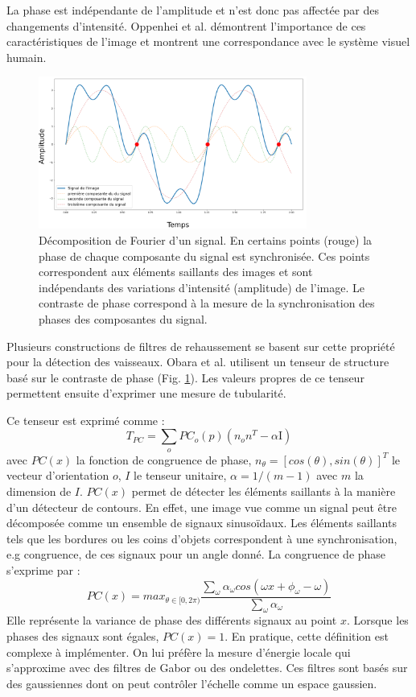 La phase est indépendante de l'amplitude et n'est donc pas affectée par des changements d'intensité. Oppenhei et al. \cite{Oppenheim1981_phase_importance} démontrent l'importance de ces caractéristiques de l'image et montrent une correspondance avec le système visuel humain. 
\begin{figure}[h]
  \centering
  \includegraphics[height=5cm]{Images/PC_decomposition.png}
  \caption{Décomposition de Fourier d'un signal. En certains points (rouge) la phase de chaque composante du signal est synchronisée. Ces points correspondent aux éléments saillants des images et sont indépendants des variations d'intensité (amplitude) de l'image. Le contraste de phase correspond à la mesure de la synchronisation des phases des composantes du signal.}
  \label{fig:phase_congruency}
\end{figure}
Plusieurs constructions de filtres de rehaussement se basent sur cette propriété pour la détection des vaisseaux. Obara et al. \cite{Obara2012_phase} utilisent un tenseur de structure basé sur le contraste de phase (Fig. \ref{fig:phase_congruency}). Les valeurs propres de ce tenseur permettent ensuite d'exprimer une mesure de tubularité.

Ce tenseur est exprimé comme :
\begin{equation}
  T_{PC} = \sum_o PC_{o}(p)(n_{o}n^T - \alpha \text{I})
\end{equation}
avec $PC(x)$ la fonction de congruence de phase, $n_{\theta}=[cos(\theta),sin(\theta)]^T$ le vecteur d'orientation $o$, $I$ le tenseur unitaire, $\alpha = 1/(m-1)$ avec $m$ la dimension de $I$. $PC(x)$ permet de détecter les éléments saillants à la manière d'un détecteur de contours.
En effet, une image vue comme un signal peut être décomposée comme un ensemble de signaux sinusoïdaux. Les éléments saillants tels que les bordures ou les coins d'objets correspondent à une synchronisation, e.g congruence, de ces signaux pour un angle donné. La congruence de phase s'exprime par :
\begin{equation}
  PC(x) = max_{\theta \in [0,2\pi)}  \frac{\sum_\omega \alpha_{\omega}cos(\omega x + \phi_{\omega} - \omega)  }{\sum_\omega \alpha_{\omega} }
\end{equation}
Elle représente la variance de phase des différents signaux au point $x$. Lorsque les phases des signaux sont égales, $PC(x)=1$.
En pratique, cette définition est complexe à implémenter. On lui préfère la mesure d'énergie locale qui s'approxime avec des filtres de Gabor ou des ondelettes. Ces filtres sont basés sur des gaussiennes dont on peut contrôler l'échelle comme un espace gaussien.

